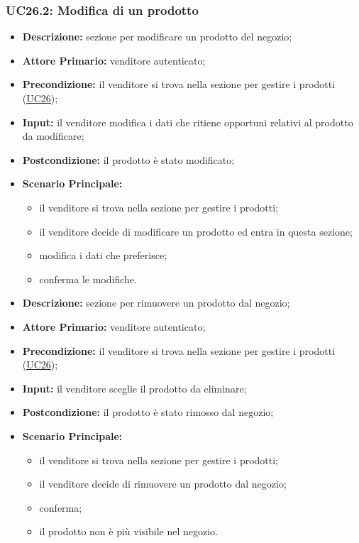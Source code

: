 \subsubsection{UC26.2: Modifica di un prodotto}
\label{sec:UC26.2}
\begin{itemize}
    \item \textbf{Descrizione:} sezione per modificare un prodotto del negozio;
    \item \textbf{Attore Primario:} venditore autenticato;
    \item \textbf{Precondizione:} il venditore si trova nella sezione per gestire i prodotti (\hyperref[sec:UC26]{\underline{UC26}});
    \item \textbf{Input:} il venditore modifica i dati che ritiene opportuni relativi al prodotto da modificare;
    \item \textbf{Postcondizione:} il prodotto è stato modificato;
    \item \textbf{Scenario Principale:}
          \begin{itemize}
              \item il venditore si trova nella sezione per gestire i prodotti;
              \item il venditore decide di modificare un prodotto ed entra in questa sezione;
              \item modifica i dati che preferisce;
              \item conferma le modifiche.
          \end{itemize}
\end{itemize}
\label{sec:UC26.3}
\begin{itemize}
    \item \textbf{Descrizione:} sezione per rimuovere un prodotto dal negozio;
    \item \textbf{Attore Primario:} venditore autenticato;
    \item \textbf{Precondizione:} il venditore si trova nella sezione per gestire i prodotti (\hyperref[sec:UC26]{\underline{UC26}});
    \item \textbf{Input:} il venditore sceglie il prodotto da eliminare;
    \item \textbf{Postcondizione:} il prodotto è stato rimosso dal negozio;
    \item \textbf{Scenario Principale:}
          \begin{itemize}
              \item il venditore si trova nella sezione per gestire i prodotti;
              \item il venditore decide di rimuovere un prodotto dal negozio;
              \item conferma;
              \item il prodotto non è più visibile nel negozio.
          \end{itemize}
\end{itemize}